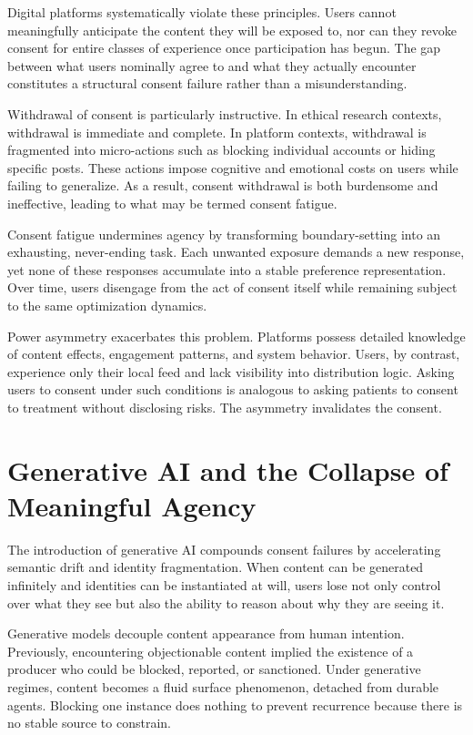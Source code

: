 \documentclass[11pt,oneside]{article}
\begin{document}
Digital platforms systematically violate these principles. Users cannot meaningfully anticipate the content they will be exposed to, nor can they revoke consent for entire classes of experience once participation has begun. The gap between what users nominally agree to and what they actually encounter constitutes a structural consent failure rather than a misunderstanding.

Withdrawal of consent is particularly instructive. In ethical research contexts, withdrawal is immediate and complete. In platform contexts, withdrawal is fragmented into micro-actions such as blocking individual accounts or hiding specific posts. These actions impose cognitive and emotional costs on users while failing to generalize. As a result, consent withdrawal is both burdensome and ineffective, leading to what may be termed consent fatigue.

Consent fatigue undermines agency by transforming boundary-setting into an exhausting, never-ending task. Each unwanted exposure demands a new response, yet none of these responses accumulate into a stable preference representation. Over time, users disengage from the act of consent itself while remaining subject to the same optimization dynamics.

Power asymmetry exacerbates this problem. Platforms possess detailed knowledge of content effects, engagement patterns, and system behavior. Users, by contrast, experience only their local feed and lack visibility into distribution logic. Asking users to consent under such conditions is analogous to asking patients to consent to treatment without disclosing risks. The asymmetry invalidates the consent.

\section{Generative AI and the Collapse of Meaningful Agency}

The introduction of generative AI compounds consent failures by accelerating semantic drift and identity fragmentation. When content can be generated infinitely and identities can be instantiated at will, users lose not only control over what they see but also the ability to reason about why they are seeing it.

Generative models decouple content appearance from human intention. Previously, encountering objectionable content implied the existence of a producer who could be blocked, reported, or sanctioned. Under generative regimes, content becomes a fluid surface phenomenon, detached from durable agents. Blocking one instance does nothing to prevent recurrence because there is no stable source to constrain.
\end{document}
